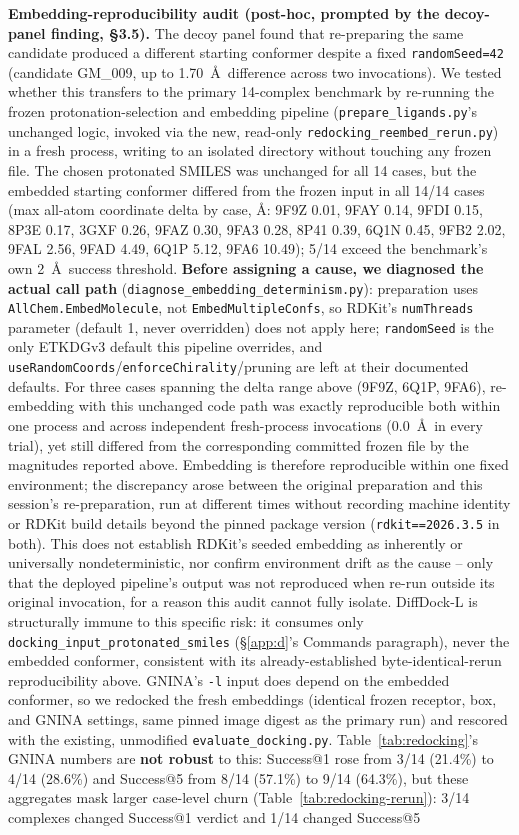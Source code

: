 \documentclass{article}
\begin{document}
\textbf{Embedding-reproducibility audit (post-hoc, prompted by the decoy-panel finding, \S3.5).} The decoy panel found that re-preparing the same candidate produced a different starting conformer despite a fixed \texttt{randomSeed=42} (candidate GM\_009, up to 1.70~\AA\ difference across two invocations). We tested whether this transfers to the primary 14-complex benchmark by re-running the frozen protonation-selection and embedding pipeline (\texttt{prepare\_ligands.py}'s unchanged logic, invoked via the new, read-only \texttt{redocking\_reembed\_rerun.py}) in a fresh process, writing to an isolated directory without touching any frozen file. The chosen protonated SMILES was unchanged for all 14 cases, but the embedded starting conformer differed from the frozen input in all 14/14 cases (max all-atom coordinate delta by case, \AA: 9F9Z 0.01, 9FAY 0.14, 9FDI 0.15, 8P3E 0.17, 3GXF 0.26, 9FAZ 0.30, 9FA3 0.28, 8P41 0.39, 6Q1N 0.45, 9FB2 2.02, 9FAL 2.56, 9FAD 4.49, 6Q1P 5.12, 9FA6 10.49); 5/14 exceed the benchmark's own 2~\AA\ success threshold. \textbf{Before assigning a cause, we diagnosed the actual call path} (\texttt{diagnose\_embedding\_determinism.py}): preparation uses \texttt{AllChem.EmbedMolecule}, not \texttt{EmbedMultipleConfs}, so RDKit's \texttt{numThreads} parameter (default 1, never overridden) does not apply here; \texttt{randomSeed} is the only ETKDGv3 default this pipeline overrides, and \texttt{useRandomCoords}/\texttt{enforceChirality}/pruning are left at their documented defaults. For three cases spanning the delta range above (9F9Z, 6Q1P, 9FA6), re-embedding with this unchanged code path was exactly reproducible both within one process and across independent fresh-process invocations (0.0~\AA\ in every trial), yet still differed from the corresponding committed frozen file by the magnitudes reported above. Embedding is therefore reproducible within one fixed environment; the discrepancy arose between the original preparation and this session's re-preparation, run at different times without recording machine identity or RDKit build details beyond the pinned package version (\texttt{rdkit==2026.3.5} in both). This does not establish RDKit's seeded embedding as inherently or universally nondeterministic, nor confirm environment drift as the cause -- only that the deployed pipeline's output was not reproduced when re-run outside its original invocation, for a reason this audit cannot fully isolate. DiffDock-L is structurally immune to this specific risk: it consumes only \texttt{docking\_input\_protonated\_smiles} (\S\ref{app:d}'s Commands paragraph), never the embedded conformer, consistent with its already-established byte-identical-rerun reproducibility above. GNINA's \texttt{-l} input does depend on the embedded conformer, so we redocked the fresh embeddings (identical frozen receptor, box, and GNINA settings, same pinned image digest as the primary run) and rescored with the existing, unmodified \texttt{evaluate\_docking.py}. Table~\ref{tab:redocking}'s GNINA numbers are \textbf{not robust} to this: Success@1 rose from 3/14 (21.4\%) to 4/14 (28.6\%) and Success@5 from 8/14 (57.1\%) to 9/14 (64.3\%), but these aggregates mask larger case-level churn (Table~\ref{tab:redocking-rerun}): 3/14 complexes changed Success@1 verdict and 1/14 changed Success@5 
\end{document}

